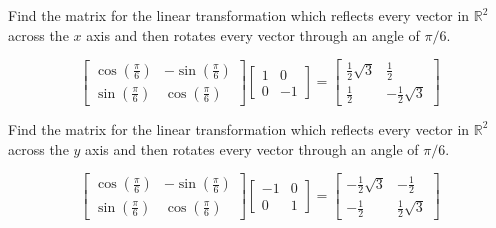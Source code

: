\documentclass{ximera}
\begin{document}
\begin{problem}\label{prb:6.22} Find the matrix for the linear transformation which reflects every
vector in $\mathbb{R}^{2}$ across the $x$ axis and then rotates every vector
through an angle of $\pi /6$.
\begin{hint}
\[
\left[
\begin{array}{cc}
\cos \left( \frac{\pi }{6}\right)  & -\sin \left( \frac{\pi }{6}\right)  \\
\sin \left( \frac{\pi }{6}\right)  & \cos \left( \frac{\pi }{6}\right)
\end{array}
\right] \left[
\begin{array}{rr}
1 & 0 \\
0 & -1
\end{array}
\right] =  \left[
\begin{array}{cc}
\frac{1}{2}\sqrt{3} & \frac{1}{2} \\
\frac{1}{2} & -\frac{1}{2}\sqrt{3}
\end{array}
\right]
\]
\end{hint}
\end{problem}

\begin{problem}\label{prb:6.23} Find the matrix for the linear transformation which reflects every
vector in $\mathbb{R}^{2}$ across the $y$ axis and then rotates every vector
through an angle of $\pi /6$.
\begin{hint}
\[
\left[
\begin{array}{cc}
\cos \left( \frac{\pi }{6}\right)  & -\sin \left( \frac{\pi }{6}\right)  \\
\sin \left( \frac{\pi }{6}\right)  & \cos \left( \frac{\pi }{6}\right)
\end{array}
\right] \left[
\begin{array}{rr}
-1 & 0 \\
0 & 1
\end{array}
\right] = \left[
\begin{array}{cc}
-\frac{1}{2}\sqrt{3} & -\frac{1}{2} \\
-\frac{1}{2} & \frac{1}{2}\sqrt{3}
\end{array}
\right]
\]
\end{hint}
\end{problem}
\end{document}
